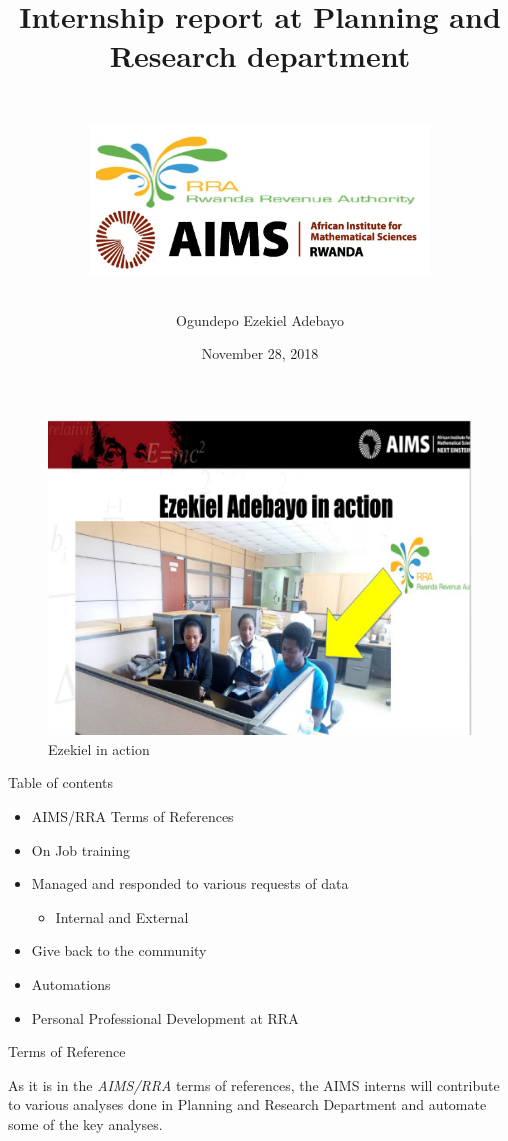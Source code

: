\documentclass[ignorenonframetext,]{beamer}
\title{Internship report at Planning and Research department}
\author[The author]{\includegraphics[height=5.6cm,width=9cm]{Images/Logo1.JPG}\\Ogundepo Ezekiel Adebayo}
\date{November 28, 2018}
\providecommand{\tightlist}{%
  \setlength{\itemsep}{0pt}\setlength{\parskip}{0pt}}
\begin{document}
\frame{\titlepage}

\begin{frame}{}
\protect\hypertarget{section}{}

\begin{figure}
\centering
\includegraphics{Images/Ezekiel_in_action.jpeg}
\caption{Ezekiel in action}
\end{figure}

\end{frame}

\begin{frame}{Table of contents}
\protect\hypertarget{table-of-contents}{}

\begin{itemize}
\tightlist
\item
  AIMS/RRA Terms of References
\item
  On Job training
\item
  Managed and responded to various requests of data

  \begin{itemize}
  \tightlist
  \item
    Internal and External
  \end{itemize}
\item
  Give back to the community
\item
  Automations
\item
  Personal Professional Development at RRA
\end{itemize}

\end{frame}

\begin{frame}{Terms of Reference}
\protect\hypertarget{terms-of-reference}{}

As it is in the \textit{AIMS/RRA} terms of references, the AIMS interns
will contribute to various analyses done in Planning and Research
Department and automate some of the key analyses.

\end{frame}
\end{document}
